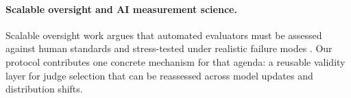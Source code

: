 \paragraph{Scalable oversight and AI measurement science.}
Scalable oversight work argues that automated evaluators must be assessed against human standards and stress-tested under realistic failure modes \citep{bowman2022scalable,zhou2025graders}.
Our protocol contributes one concrete mechanism for that agenda: a reusable validity layer for judge selection that can be reassessed across model updates and distribution shifts.
